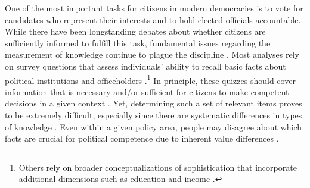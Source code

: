 

One of the most important tasks for citizens in modern democracies is to vote for candidates who represent their interests and to hold elected officials accountable. While there have been longstanding debates about whether citizens are sufficiently informed to fulfill this task, fundamental issues regarding the measurement of knowledge continue to plague the discipline \citep{mondak2001developing,sturgis2008experiment,pietryka2013analysis}. Most analyses rely on survey questions that assess individuals' ability to recall basic facts about political institutions and officeholders \citep[e.g.,][]{zaller1990political,carpini1996americans}.\footnote{Others rely on broader conceptualizations of sophistication that incorporate additional dimensions such as education and income \citep[e.g.,][]{jacoby2006value}.} In principle, these quizzes should cover information that is necessary and/or sufficient for citizens to make competent decisions in a given context \citep{lupia2006elitism}. Yet, determining such a set of relevant items proves to be extremely difficult, especially since there are systematic differences in types of knowledge \citep{barabas2014question}. Even within a given policy area, people may disagree about which facts are crucial for political competence due to inherent value differences \citep{lupia2015uninformed}. 

